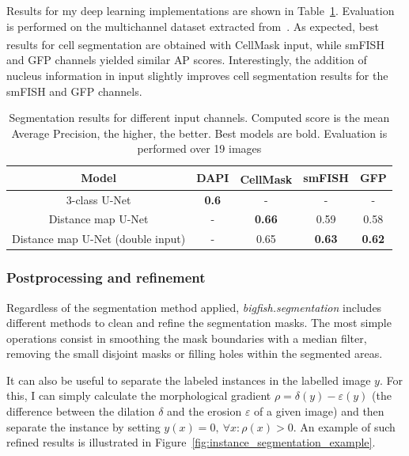 Results for my deep learning implementations are shown in Table~\ref{table:segmentation_results}.
Evaluation is performed on the multichannel dataset extracted from~\cite{safieddine_choreography_2021}.
As expected, best results for cell segmentation are obtained with CellMask\textsuperscript{\texttrademark} input, while \ac{smFISH} and \ac{GFP} channels yielded similar \ac{AP} scores.
Interestingly, the addition of nucleus information in input slightly improves cell segmentation results for the \ac{smFISH} and \ac{GFP} channels.

\begin{table}[]
	\centering
	\begin{tabular}{| c | c | c | c | c |}
		\hline
		Model & DAPI & CellMask\textsuperscript{\texttrademark} & smFISH & GFP\\
		\hline
		3-class U-Net & \textbf{0.6} & - & - & -\\
		Distance map U-Net & - & \textbf{0.66} & 0.59 & 0.58\\
		Distance map U-Net (double input) & - & 0.65 & \textbf{0.63} & \textbf{0.62}\\
		\hline
	\end{tabular}
	\caption[Segmentation results]{Segmentation results for different input channels.
	Computed score is the mean Average Precision, the higher, the better.
	Best models are bold.
	Evaluation is performed over 19 images}
	\label{table:segmentation_results}
\end{table}

\subsubsection{Postprocessing and refinement}

Regardless of the segmentation method applied, \emph{bigfish.segmentation} includes different methods to clean and refine the segmentation masks.
The most simple operations consist in smoothing the mask boundaries with a median filter, removing the small disjoint masks or filling holes within the segmented areas.

It can also be useful to separate the labeled instances in the labelled image $y$.
For this, I can simply calculate the morphological gradient $\rho = \delta(y) - \varepsilon(y)$ (the difference between the dilation $\delta$ and the erosion $\varepsilon$ of a given image) and then separate the instance by setting $y(x) = 0, \: \forall x: \rho(x) > 0$.
An example of such refined results is illustrated in Figure~\ref{fig:instance_segmentation_example}.

